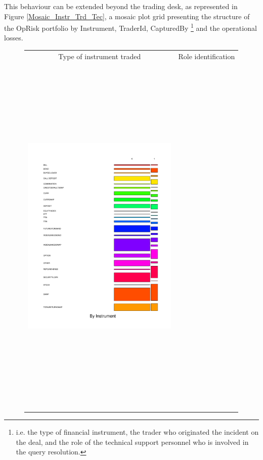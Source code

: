 \documentclass{DissertateUSU}
\begin{document}
This behaviour can be extended beyond the trading desk, as represented
in Figure \ref{Mosaic_Instr_Trd_Tec}, a mosaic plot grid presenting the
structure of the OpRisk portfolio by Instrument, TraderId, CapturedBy
\footnote{i.e. the type of financial instrument, the trader who originated the incident on the deal, and the role of the technical support personnel who is involved in the query resolution.}
and the operational losses.

\singlespacing

\doublespacing

\begin{figure}
\begin{frame}
      \centering
       \begin{tabular}{cc}
        Type of instrument traded & Role identification \\
        \includegraphics[width=7.5cm,height=18cm]{Single_Instr.pdf}
         &

\end{tabular}
\end{frame}
\end{figure}
\end{document}
